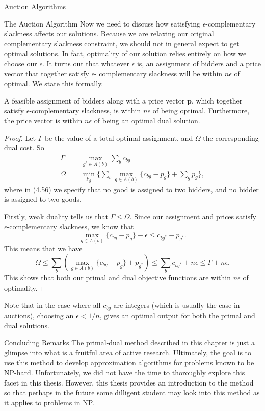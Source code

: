 \begin{section}{Auction Algorithms}
\begin{subsection}{The Auction Algorithm}
		Now we need to discuss how satisfying $\epsilon$-complementary slackness affects our 
		solutions. Because we are relaxing our original complementary slackness constraint, 
		we should not in general expect to get optimal solutions. 
		In fact, optimality of our solution relies entirely on 
		how we choose our $\epsilon$. It turns out that whatever $\epsilon$ is, 
		an assignment of bidders and a price vector that together satisfy $\epsilon$-
		complementary slackness will be within $n\epsilon$ of optimal. We state this formally.
		\begin{theorem}
			A feasible assignment of bidders along with a price vector $\mathbf{p}$, 
			which together satisfy $\epsilon$-complementary slackness, 
			is within $n\epsilon$ of being optimal. 
			Furthermore, the price vector is within $n\epsilon$ of being an optimal dual 
			solution.
		\end{theorem}
		\begin{proof}
			Let $\Gamma$ be the value of a total optimal assignment, and $\Omega$ the 
			corresponding dual cost. So 
			\begin{align}
				\Gamma &= \max_{g^{*}\in A(b)} \sum_b c_{bg} \\
				\Omega &= \min_{p_g} \{\sum_b \max_{g\in A(b)} \{c_{bg} - p_g\} + 
				\sum_g p_g\},
			\end{align}
			where in (4.56) we specify that no good is assigned to two bidders, and no bidder 
			is assigned to two goods.

			Firstly, weak duality tells us that $\Gamma \leq \Omega$. Since our assignment 
			and prices satisfy $\epsilon$-complementary slackness, we know that 
			\[
				\max_{g\in A(b)} \{c_{bg} - p_g\} - \epsilon \leq c_{bg^{*}} - p_{g^{*}}.
			\]
			This means that we have 
			\[
				\Omega \leq \sum_b \left(\max_{g\in A(b)} \{c_{bg} - p_g\} + p_{g^{*}} 
				\right) \leq \sum_b c_{bg^{*}} + n\epsilon \leq \Gamma + n\epsilon.
			\]
			This shows that both our primal and dual objective functions are within 
			$n\epsilon$ of optimality.
		\end{proof}
		Note that in the case where all $c_{bg}$ are integers (which is usually the case in 
		auctions), choosing an $\epsilon < 1/n$, gives an optimal output for both the primal 
		and dual solutions.
\end{subsection}
\end{section}
\begin{section}{Concluding Remarks}
The primal-dual method described in this chapter is just a glimpse into what is a fruitful area of 
active research. Ultimately, the goal is to use this method to develop approximation algorithms 
for problems known to be NP-hard. Unfortunately, we did not have the time to thoroughly explore 
this facet in this thesis. However, this thesis provides an introduction to the method so that 
perhaps in the future some dilligent student may look into this method as it applies to problems in NP.
\end{section}
